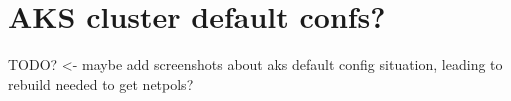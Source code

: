 \section{AKS cluster default confs?}
TODO? <- maybe add screenshots about aks default config situation, leading to rebuild needed to get netpols?



